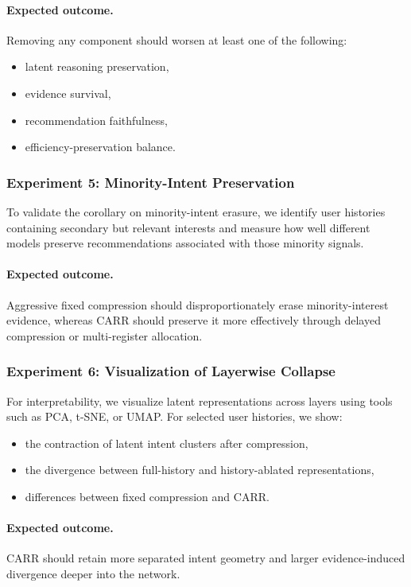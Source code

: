 \documentclass[11pt]{article}
\begin{document}
\paragraph{Expected outcome.}
Removing any component should worsen at least one of the following:
\begin{itemize}
    \item latent reasoning preservation,
    \item evidence survival,
    \item recommendation faithfulness,
    \item efficiency-preservation balance.
\end{itemize}

\subsubsection{Experiment 5: Minority-Intent Preservation}

To validate the corollary on minority-intent erasure, we identify user histories containing secondary but relevant interests and measure how well different models preserve recommendations associated with those minority signals.

\paragraph{Expected outcome.}
Aggressive fixed compression should disproportionately erase minority-interest evidence, whereas CARR should preserve it more effectively through delayed compression or multi-register allocation.

\subsubsection{Experiment 6: Visualization of Layerwise Collapse}

For interpretability, we visualize latent representations across layers using tools such as PCA, t-SNE, or UMAP. For selected user histories, we show:
\begin{itemize}
    \item the contraction of latent intent clusters after compression,
    \item the divergence between full-history and history-ablated representations,
    \item differences between fixed compression and CARR.
\end{itemize}

\paragraph{Expected outcome.}
CARR should retain more separated intent geometry and larger evidence-induced divergence deeper into the network.
\end{document}
